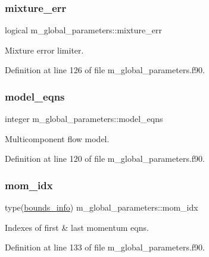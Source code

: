 \subsubsection{\texorpdfstring{mixture\+\_\+err}{mixture\_err}}
{\footnotesize\ttfamily logical m\+\_\+global\+\_\+parameters\+::mixture\+\_\+err}



Mixture error limiter. 



Definition at line 126 of file m\+\_\+global\+\_\+parameters.\+f90.

\mbox{\label{namespacem__global__parameters_a6cf2e92cfc3b519fb6da6fe9e88fab31}} 
\subsubsection{\texorpdfstring{model\+\_\+eqns}{model\_eqns}}
{\footnotesize\ttfamily integer m\+\_\+global\+\_\+parameters\+::model\+\_\+eqns}



Multicomponent flow model. 



Definition at line 120 of file m\+\_\+global\+\_\+parameters.\+f90.

\mbox{\label{namespacem__global__parameters_ad138d35528cf27ff42dba00d13c269be}} 
\subsubsection{\texorpdfstring{mom\+\_\+idx}{mom\_idx}}
{\footnotesize\ttfamily type(\hyperlink{structm__derived__types_1_1bounds__info}{bounds\+\_\+info}) m\+\_\+global\+\_\+parameters\+::mom\+\_\+idx}



Indexes of first \& last momentum eqns. 



Definition at line 133 of file m\+\_\+global\+\_\+parameters.\+f90.

